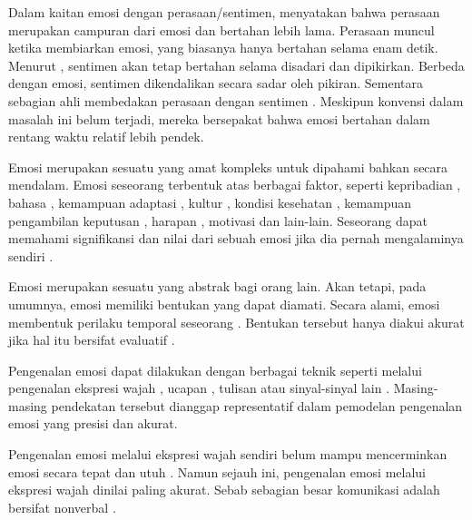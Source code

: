 Dalam kaitan emosi dengan perasaan/sentimen,  menyatakan bahwa perasaan merupakan campuran dari emosi dan bertahan lebih lama. Perasaan muncul ketika membiarkan emosi, yang biasanya hanya bertahan selama enam detik. Menurut , sentimen akan tetap bertahan selama disadari dan dipikirkan. Berbeda dengan emosi, sentimen dikendalikan secara sadar oleh pikiran. Sementara sebagian ahli membedakan perasaan dengan sentimen . Meskipun konvensi dalam masalah ini belum terjadi, mereka bersepakat bahwa emosi bertahan dalam rentang waktu relatif lebih pendek.

Emosi merupakan sesuatu yang amat kompleks untuk dipahami bahkan secara mendalam. Emosi seseorang terbentuk atas berbagai faktor, seperti kepribadian , bahasa , kemampuan adaptasi , kultur , kondisi kesehatan , kemampuan pengambilan keputusan , harapan , motivasi  dan lain-lain. Seseorang dapat memahami signifikansi dan nilai dari sebuah emosi jika dia pernah mengalaminya sendiri .

Emosi merupakan sesuatu yang abstrak bagi orang lain. Akan tetapi, pada umumnya, emosi memiliki bentukan yang dapat diamati. Secara alami, emosi membentuk perilaku temporal seseorang . Bentukan tersebut hanya diakui akurat jika hal itu bersifat evaluatif .

Pengenalan emosi dapat dilakukan dengan berbagai teknik seperti melalui pengenalan ekspresi wajah , ucapan , tulisan  atau sinyal-sinyal lain . Masing-masing pendekatan tersebut dianggap representatif dalam pemodelan pengenalan emosi yang presisi dan akurat.

Pengenalan emosi melalui ekspresi wajah sendiri belum mampu mencerminkan emosi secara tepat dan utuh . Namun sejauh ini, pengenalan emosi melalui ekspresi wajah dinilai paling akurat. Sebab sebagian besar komunikasi adalah bersifat nonverbal .

